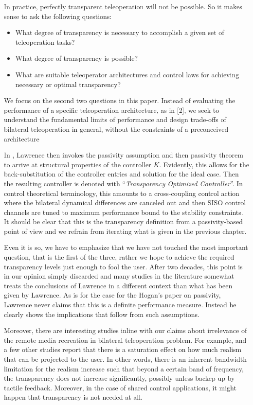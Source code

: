 \begin{displayquote}
In practice, perfectly transparent teleoperation will not be possible. So it makes sense to ask the following questions:
\begin{itemize}
	\item What degree of transparency is necessary to accomplish a given set of teleoperation tasks? 
	\item What degree of transparency is possible?
	\item What are suitable teleoperator architectures and control laws for achieving necessary or optimal transparency?
\end{itemize}
We focus on the second two questions in this paper. Instead of evaluating the performance of a specific teleoperation architecture,
as in [2], we seek to understand the fundamental limits of performance and design trade-offs of bilateral teleoperation in
general, without the constraints of a preconceived architecture
\end{displayquote}
In \cite{lawrence}, Lawrence then invokes the passivity assumption and then passivity theorem to arrive at structural 
properties of the controller $K$. Evidently, this allows for the back-substitution of the controller entries and solution
for the ideal case. Then the resulting controller is denoted with \enquote{\emph{Transparency Optimized Controller}}. In 
control theoretical terminology, this amounts to a cross-coupling control action where the bilateral dynamical differences
are canceled out and then SISO control channels are tuned to maximum performance bound to the stability constraints. It 
should be clear that this is the transparency definition from a passivity-based point of view and we refrain from iterating 
what is given in the previous chapter. 

Even it is so, we have to emphasize that we have not touched the most important question, that is the first of the three, 
rather we hope to achieve the required transparency levels just enough to fool the user. After two decades, this point is 
in our opinion simply discarded and many studies in the literature somewhat treats the conclusions of Lawrence in a different 
context than what has been given by Lawrence. As is for the case for the Hogan's paper on passivity, Lawrence never claims 
that this is a definite performance measure. Instead he clearly shows the implications that follow from such assumptions. 


Moreover, there are interesting studies inline with our claims about irrelevance of the remote media recreation in bilateral
teleoperation problem. For example, \cite{kilchenman,wildenbeest} and a few other studies report that there is a saturation
effect on how much realism that can be projected to the user. In other words, there is an inherent bandwidth limitation for 
the realism increase such that beyond a certain band of frequency, the transparency does not increase significantly, possibly
unless backep up by tactile feedback. Moreover, in the case of shared control applications, it might happen that transparency 
is not needed at all. 



